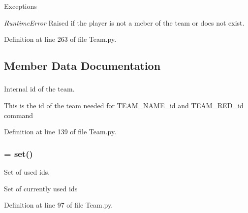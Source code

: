 \begin{DoxyExceptions}{Exceptions}
\item[{\em RuntimeError}]Raised if the player is not a meber of the team or does not exist. \end{DoxyExceptions}


Definition at line 263 of file Team.py.



\subsection{Member Data Documentation}
\hypertarget{class_team_1_1_team_a7ce63ee4a4004c0248fd10694054f459}{
\subsubsection[{\_\-\_\-id}]{}}
\label{class_team_1_1_team_a7ce63ee4a4004c0248fd10694054f459}


Internal id of the team. 

This is the id of the team needed for TEAM\_\-NAME\_\-id and TEAM\_\-RED\_\-id command 

Definition at line 139 of file Team.py.

\hypertarget{class_team_1_1_team_a262d61c33dc00a565e627421b95280e4}{
\subsubsection[{\_\-\_\-ids}]{ = set()}}
\label{class_team_1_1_team_a262d61c33dc00a565e627421b95280e4}


Set of used ids. 

Set of currently used ids 

Definition at line 97 of file Team.py.

\hypertarget{class_team_1_1_team_a5298a0b6a24b1c1245690a39b1b83d19}{
\subsubsection[{\_\-\_\-members}]{}}
\label{class_team_1_1_team_a5298a0b6a24b1c1245690a39b1b83d19}


